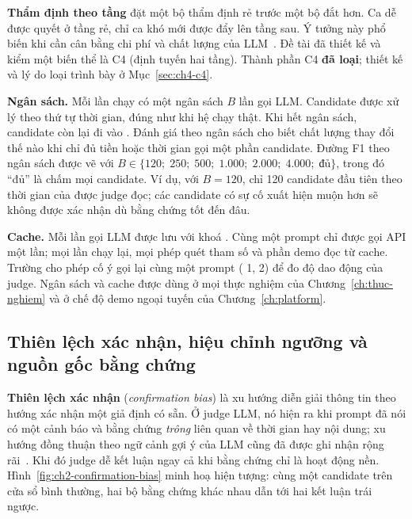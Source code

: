 \textbf{Thẩm định theo tầng} đặt một bộ thẩm định rẻ trước một bộ đắt hơn. Ca dễ được quyết ở tầng rẻ, chỉ ca khó mới được đẩy lên tầng sau. Ý tưởng này phổ biến khi cần cân bằng chi phí và chất lượng của LLM~\cite{chen2024frugalgpt}. Đề tài đã thiết kế và kiểm một biến thể là C4 (định tuyến hai tầng). Thành phần C4 \textbf{đã loại}; thiết kế và lý do loại trình bày ở Mục~\ref{sec:ch4-c4}.

\textbf{Ngân sách.} Mỗi lần chạy có một ngân sách $B$ lần gọi LLM. Candidate được xử lý theo thứ tự thời gian, đúng như khi hệ chạy thật. Khi hết ngân sách, candidate còn lại đi vào . Đánh giá theo ngân sách cho biết chất lượng thay đổi thế nào khi chỉ đủ tiền hoặc thời gian gọi một phần candidate. Đường F1 theo ngân sách được vẽ với $B \in \{120;\; 250;\; 500;\; 1.000;\; 2.000;\; 4.000;\; \text{đủ}\}$, trong đó ``đủ'' là chấm mọi candidate. Ví dụ, với $B = 120$, chỉ 120 candidate đầu tiên theo thời gian của  được judge đọc; các candidate có sự cố xuất hiện muộn hơn sẽ không được xác nhận dù bằng chứng tốt đến đâu.

\textbf{Cache.} Mỗi lần gọi LLM được lưu với khoá . Cùng một prompt chỉ được gọi API một lần; mọi lần chạy lại, mọi phép quét tham số và phần demo đọc từ cache. Trường  cho phép cố ý gọi lại cùng một prompt ( 1, 2) để đo độ dao động của judge. Ngân sách và cache được dùng ở mọi thực nghiệm của Chương~\ref{ch:thuc-nghiem} và ở chế độ demo ngoại tuyến của Chương~\ref{ch:platform}.

\subsection{Thiên lệch xác nhận, hiệu chỉnh ngưỡng và nguồn gốc bằng chứng}
\label{sec:ch2-thien-lech}

\textbf{Thiên lệch xác nhận} (\emph{confirmation bias}) là xu hướng diễn giải thông tin theo hướng xác nhận một giả định có sẵn. Ở judge LLM, nó hiện ra khi prompt đã nói có một cảnh báo và bằng chứng \emph{trông} liên quan về thời gian hay nội dung; xu hướng đồng thuận theo ngữ cảnh gợi ý của LLM cũng đã được ghi nhận rộng rãi~\cite{sharma2024sycophancy}. Khi đó judge dễ kết luận  ngay cả khi bằng chứng chỉ là hoạt động nền. Hình~\ref{fig:ch2-confirmation-bias} minh hoạ hiện tượng: cùng một candidate trên cửa sổ bình thường, hai bộ bằng chứng khác nhau dẫn tới hai kết luận trái ngược.

